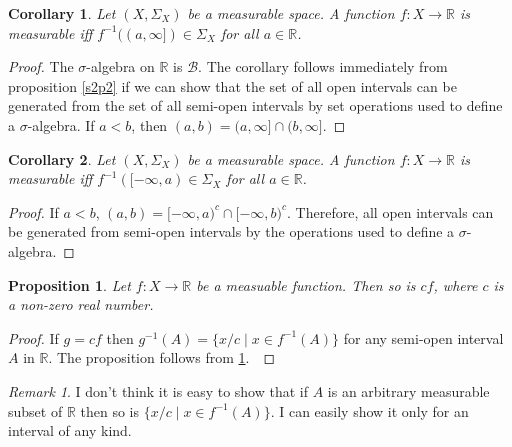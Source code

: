 \documentclass{article}
\newcommand{\sor}{\mathbb{R}}
\theoremstyle{plain}
\numberwithin{thm}{section}
\theoremstyle{plain}
\newtheorem{prop}{Proposition}
\numberwithin{prop}{section}
\theoremstyle{definition}
\numberwithin{defn}{section}
\theoremstyle{remark}
\newtheorem*{rem}{Remark}
\theoremstyle{plain}
\newtheorem{cor}{Corollary}
\numberwithin{cor}{section}
\numberwithin{equation}{section}
\begin{document}
\begin{cor}\label{s2c2}
Let $(X, \Sigma_X)$ be a measurable space. A function $f: X \rightarrow \sor$
is measurable iff $f^{-1}((a, \infty]) \in \Sigma_X$ for all $a \in \sor$.
\end{cor}
\begin{proof}
The $\sigma$-algebra on $\sor$ is $\mathcal{B}$. The corollary follows immediately
from proposition \ref{s2p2} if we can show that the set of all open intervals
can be generated from the set of all semi-open intervals by set operations used
to define a $\sigma$-algebra. If $a < b$, then $(a, b) = (a, \infty] \cap (b,
\infty]$.
\end{proof}

\begin{cor}\label{s2c3}
Let $(X, \Sigma_X)$ be a measurable space. A function $f: X \rightarrow \sor$
is measurable iff $f^{-1}([-\infty, a) \in \Sigma_X$ for all $a \in \sor$.
\end{cor}
\begin{proof}
If $a < b$, $(a, b) = [-\infty, a)^c \cap [-\infty, b)^c$. Therefore, all open
intervals can be generated from semi-open intervals by the operations used to
define a $\sigma$-algebra.
\end{proof}

\begin{prop}\label{s2p3}
Let $f: X \rightarrow \sor$ be a measuable function. Then so is $cf$, where $c$
is a non-zero real number.
\end{prop}
\begin{proof}
If $g = cf$ then $g^{-1}(A) = \{x/c \;|\; x \in f^{-1}(A)\}$ for any semi-open 
interval $A$ in $\mathbb{R}$. The proposition follows from \ref{s2c2}.\
\end{proof}

\begin{rem}
I don't think it is easy to show that if $A$ is an arbitrary measurable subset 
of $\sor$ then so is $\{x/c \;|\; x \in f^{-1}(A)\}$. I can easily show it only 
for an interval of any kind.
\end{rem}
\end{document}
